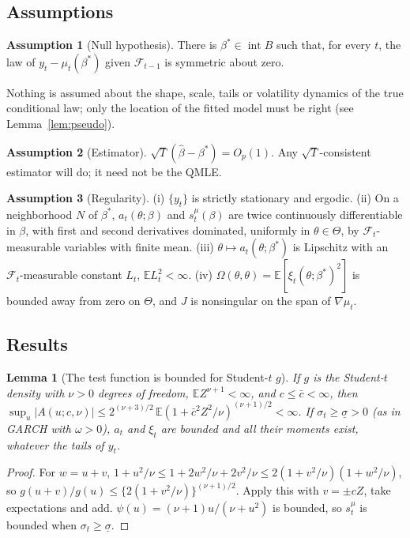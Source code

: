 \documentclass[11pt,a4paper]{article}
\newtheorem{lemma}{Lemma}
\theoremstyle{definition}
\newtheorem{assumption}{Assumption}
\theoremstyle{remark}
\newcommand{\E}{\mathbb{E}}
\newcommand{\F}{\mathcal{F}}
\begin{document}
\subsection{Assumptions}
\begin{assumption}[Null hypothesis]\label{A:null}
There is $\beta^*\in\operatorname{int}B$ such that, for every $t$, the law of $y_t-\mu_t(\beta^*)$ given $\F_{t-1}$ is symmetric about zero.
\end{assumption}
\noindent Nothing is assumed about the shape, scale, tails or volatility dynamics of the true conditional law; only the location of the fitted model must be right (see Lemma~\ref{lem:pseudo}).

\begin{assumption}[Estimator]\label{A:est}
$\sqrt T(\hat\beta-\beta^*)=O_p(1)$. Any $\sqrt T$-consistent estimator will do; it need not be the QMLE.
\end{assumption}

\begin{assumption}[Regularity]\label{A:reg}
(i) $\{y_t\}$ is strictly stationary and ergodic. (ii) On a neighborhood $N$ of $\beta^*$, $a_t(\theta;\beta)$ and $s^\mu_t(\beta)$ are twice continuously differentiable in $\beta$, with first and second derivatives dominated, uniformly in $\theta\in\Theta$, by $\F_t$-measurable variables with finite mean. (iii) $\theta\mapsto a_t(\theta;\beta^*)$ is Lipschitz with an $\F_t$-measurable constant $L_t$, $\E L_t^2<\infty$. (iv) $\Omega(\theta,\theta)=\E[\xi_t(\theta;\beta^*)^2]$ is bounded away from zero on $\Theta$, and $J$ is nonsingular on the span of $\nabla\mu_t$.
\end{assumption}

\subsection{Results}
\begin{lemma}[The test function is bounded for Student-$t$ $g$]\label{lem:bounded}
If $g$ is the Student-$t$ density with $\nu>0$ degrees of freedom, $\E Z^{\nu+1}<\infty$, and $c\le\bar c<\infty$, then $\sup_u|A(u;c,\nu)|\le2^{(\nu+3)/2}\,\E(1+\bar c^2Z^2/\nu)^{(\nu+1)/2}<\infty$. If $\sigma_t\ge\underline\sigma>0$ (as in GARCH with $\omega>0$), $a_t$ and $\xi_t$ are bounded and all their moments exist, whatever the tails of $y_t$.
\end{lemma}
\begin{proof}
For $w=u+v$, $1+u^2/\nu\le1+2w^2/\nu+2v^2/\nu\le2(1+v^2/\nu)(1+w^2/\nu)$, so $g(u+v)/g(u)\le\{2(1+v^2/\nu)\}^{(\nu+1)/2}$. Apply this with $v=\pm cZ$, take expectations and add. $\psi(u)=(\nu+1)u/(\nu+u^2)$ is bounded, so $s^\mu_t$ is bounded when $\sigma_t\ge\underline\sigma$.
\end{proof}
\end{document}
